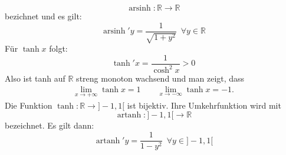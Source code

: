 \documentclass[landscape, 10pt]{article}
\newcommand{\R}{\mathbb{R}}
\begin{document}
\begin{multicols}{3}
              \begin{equation*}
                     \operatorname{arsinh}:\R\longrightarrow\R
              \end{equation*}
              bezichnet und es gilt:
              \begin{equation*}
                     \operatorname{arsinh}'y
                     =\frac{1}{\sqrt{1+y^2}}
                     \enspace\forall y\in\R
              \end{equation*}
              Für \textcolor{NavyBlue}{$\tanh x$} folgt:
              \begin{equation*}
                   \tanh'x=\frac{1}{\cosh^2x}>0  
              \end{equation*}
              Also ist tanh auf \textcolor{NavyBlue}{$\R$} streng
              monoton wachsend und man zeigt, dass 
              \begin{align*}
                     \lim\limits_{x\to+\infty}\tanh x=1\qquad
                     \lim\limits_{x\to-\infty}\tanh x=-1.
              \end{align*}
              Die Funktion \textcolor{NavyBlue}{
              $\tanh:\R\longrightarrow]-1,1[$} ist
              bijektiv. Ihre Umkehrfunktion 
              wird mit 
              \begin{equation*}
                     \operatorname{artanh}:]-1,1[
                     \longrightarrow\R
              \end{equation*}
              bezeichnet. Es gilt dann:
              \begin{equation*}
                     \operatorname{artanh}'y
                     =\frac{1}{1-y^2}\enspace
                     \forall y\in]-1,1[
              \end{equation*}

\end{multicols}
\end{document}
